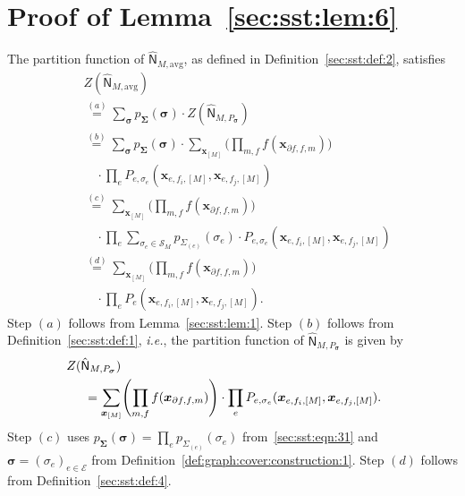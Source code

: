 \documentclass[journal]{IEEEtran}
\newcommand{\vect}[1]{ \bm{#1} }
\newcommand{\set}[1]{\mathcal{#1}}
\newcommand{\setEfull}{ \mathcal{E} }
\newcommand{\vx}{ \vect{x} }
\newcommand{\graphN}{ \mathsf{N} }
\newcommand{\hgraphN}{ \hat{\graphN} }
\newcommand{\Sigmae}{\Sigma_{(e)}}
\newcommand{\vsigma}{\vect{\sigma}}
\newcommand{\vSigma}{\vect{\Sigma}}
\newcommand{\hgraphNavg}{ \hat{\graphN}_{M,\mathrm{avg}} }
\newcommand{\efi}{ e,f_i }
\newcommand{\efj}{ e,f_j }
\newcommand{\setpff}{ \partial f, f }
\newcommand{\hgraphPsig}{ \hgraphN_{M,P_{\vsigma}} }
\newcommand*{\ie}{\textit{i.e.}}
\begin{document}
\begin{appendices}
\begin{enumerate}
  \end{enumerate}

  \section{Proof of Lemma~\ref{sec:sst:lem:6}}
  \label{apx:alternative expression of ZBM by Pe}

  The partition function of $ \hgraphNavg $, as defined in
  Definition~\ref{sec:sst:def:2}, satisfies
  \begin{align*}
     & Z(\hgraphNavg)
    \\&\overset{(a)}{=}  \sum_{\vsigma}
    p_{\vSigma}(\vsigma) \cdot Z(\hgraphPsig)
    \nonumber           \\
     & \overset{(b)}{=}
    \sum_{\vsigma}
    p_{\vSigma}(\vsigma) \! \cdot \!\!\!
    \sum_{\vx_{[M]}}
    \Biggl( \prod_{m,f} f(\vx_{\setpff,m}) \!\! \Biggr)
    \\&\quad \cdot \! \prod_{e}
    \! P_{e,\sigma_e}(\vx_{\efi,[M]}, \vx_{\efj,[M]})
    \nonumber           \\
     & \overset{(c)}{=}
    \sum_{\vx_{[M]}}
    \Biggl( \prod_{m,f} f(\vx_{\setpff,m}) \Biggr)
    \\&\quad \cdot \prod_{e}
    \sum_{ \sigma_e \in \set{S}_M } \!\!\! p_{\Sigmae}(\sigma_e)
    \cdot P_{e,\sigma_e}(\vx_{\efi,[M]}, \vx_{\efj,[M]})
    \nonumber           \\
     & \overset{(d)}{=}
    \sum_{\vx_{[M]}}
    \Biggl( \prod_{m,f} f(\vx_{\setpff,m}) \Biggr)
    \\&\quad \cdot \prod_{e}
    P_{e}(\vx_{\efi,[M]}, \vx_{\efj,[M]}).
  \end{align*}
  Step $(a)$ follows from Lemma~\ref{sec:sst:lem:1}. Step $(b)$ follows from
  Definition~\ref{sec:sst:def:1}, \ie,
  the partition function of $ \hgraphPsig $ is given by
  \begin{align*}
     & \hspace{-0.5cm}
    Z(\hgraphPsig)
    \\&=  \sum_{\vx_{[M]}}
    \Biggl( \prod_{m,f} f(\vx_{\setpff,m}) \Biggr)
    \cdot \prod_{e}  P_{e,\sigma_e}(\vx_{\efi,[M]}, \vx_{\efj,[M]}).
  \end{align*}
  Step $(c)$ uses $ p_{\vSigma}(\vsigma) = \prod_{e}p_{\Sigmae}(\sigma_e) $ from~\eqref{sec:sst:eqn:31} and $ \vsigma = (\sigma_e)_{e \in \setEfull} $ from Definition~\ref{def:graph:cover:construction:1}.
  Step $(d)$ follows from Definition~\ref{sec:sst:def:4}.


\end{appendices}
\end{document}
